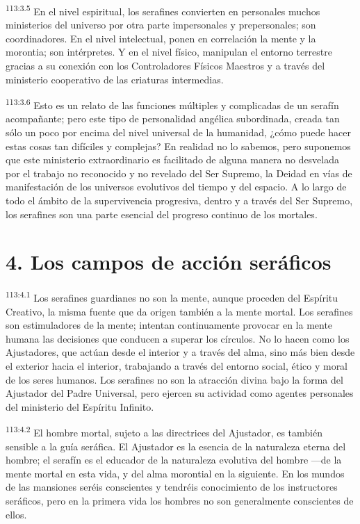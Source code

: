 \documentclass[twoside, 11pt]{book}
\begin{document}
\par
\textsuperscript{113:3.5} En el nivel espiritual, los serafines convierten en personales muchos ministerios del universo por otra parte impersonales y prepersonales; son coordinadores. En el nivel intelectual, ponen en correlación la mente y la morontia; son intérpretes. Y en el nivel físico, manipulan el entorno terrestre gracias a su conexión con los Controladores Físicos Maestros y a través del ministerio cooperativo de las criaturas intermedias.

\par
\textsuperscript{113:3.6} Esto es un relato de las funciones múltiples y complicadas de un serafín acompañante; pero este tipo de personalidad angélica subordinada, creada tan sólo un poco por encima del nivel universal de la humanidad, ¿cómo puede hacer estas cosas tan difíciles y complejas? En realidad no lo sabemos, pero suponemos que este ministerio extraordinario es facilitado de alguna manera no desvelada por el trabajo no reconocido y no revelado del Ser Supremo, la Deidad en vías de manifestación de los universos evolutivos del tiempo y del espacio. A lo largo de todo el ámbito de la supervivencia progresiva, dentro y a través del Ser Supremo, los serafines son una parte esencial del progreso continuo de los mortales.

\section*{4. Los campos de acción seráficos}
\par
\textsuperscript{113:4.1} Los serafines guardianes no son la mente, aunque proceden del Espíritu Creativo, la misma fuente que da origen también a la mente mortal. Los serafines son estimuladores de la mente; intentan continuamente provocar en la mente humana las decisiones que conducen a superar los círculos. No lo hacen como los Ajustadores, que actúan desde el interior y a través del alma, sino más bien desde el exterior hacia el interior, trabajando a través del entorno social, ético y moral de los seres humanos. Los serafines no son la atracción divina bajo la forma del Ajustador del Padre Universal, pero ejercen su actividad como agentes personales del ministerio del Espíritu Infinito.

\par
\textsuperscript{113:4.2} El hombre mortal, sujeto a las directrices del Ajustador, es también sensible a la guía seráfica. El Ajustador es la esencia de la naturaleza eterna del hombre; el serafín es el educador de la naturaleza evolutiva del hombre ---de la mente mortal en esta vida, y del alma morontial en la siguiente. En los mundos de las mansiones seréis conscientes y tendréis conocimiento de los instructores seráficos, pero en la primera vida los hombres no son generalmente conscientes de ellos.
\end{document}
